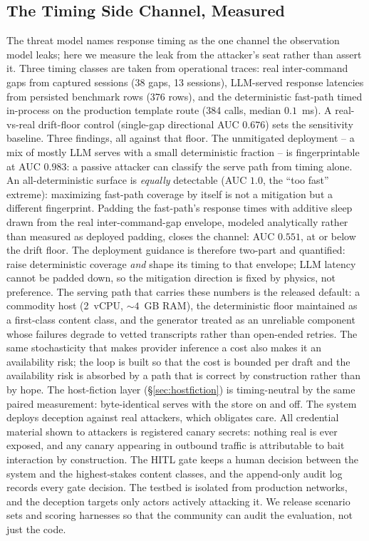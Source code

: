 \subsection{The Timing Side Channel, Measured}
\label{sec:timing-measured}
The threat model names response timing as the one
channel the observation model leaks; here we measure the leak from the
attacker's seat rather than assert it. Three timing classes are taken
from operational traces: real inter-command gaps from captured sessions
(38 gaps, 13 sessions), LLM-served response latencies from persisted
benchmark rows (376 rows), and the deterministic fast-path timed
in-process on the production template route (384 calls, median $0.1$~ms).
A real-vs-real drift-floor control (single-gap directional AUC $0.676$)
sets the sensitivity baseline. Three findings, all against that floor.
The unmitigated deployment -- a mix of mostly LLM serves with a small
deterministic fraction -- is fingerprintable at AUC $0.983$: a passive
attacker can classify the serve path from timing alone. An all-deterministic
surface is \emph{equally} detectable (AUC $1.0$, the ``too fast''
extreme): maximizing fast-path coverage by itself is not a mitigation
but a different fingerprint. Padding the fast-path's response times
with additive sleep drawn from the real inter-command-gap envelope,
modeled analytically rather than measured as deployed padding, closes
the channel: AUC $0.551$, at or below the drift floor. The deployment
guidance is therefore two-part and quantified: raise deterministic
coverage \emph{and} shape its timing to that envelope; LLM latency
cannot be padded down, so the
mitigation direction is fixed by physics, not preference. The serving
path that carries these numbers is the released default: a commodity
host (2~vCPU, ${\sim}4$~GB RAM), the deterministic floor maintained as a
first-class content class, and the generator treated as an unreliable
component whose failures degrade to vetted transcripts rather than
open-ended retries. The same stochasticity that makes provider inference
a cost also makes it an availability risk; the loop is built so that the
cost is bounded per draft and the availability risk is absorbed by a
path that is correct by construction rather than by hope. The
host-fiction layer (\S\ref{sec:hostfiction}) is timing-neutral by the same
paired measurement: byte-identical serves with the store on and off.
The system deploys deception against real attackers, which obligates
care. All credential material shown to attackers is registered canary
secrets: nothing real is ever exposed, and any canary appearing in
outbound traffic is attributable to bait interaction by construction. The
HITL gate keeps a human decision between the system and the highest-stakes
content classes, and the append-only audit log records every gate
decision. The testbed is isolated from production networks, and the
deception targets only actors actively attacking it. We release scenario
sets and scoring harnesses so that the community can audit the
evaluation, not just the code.

